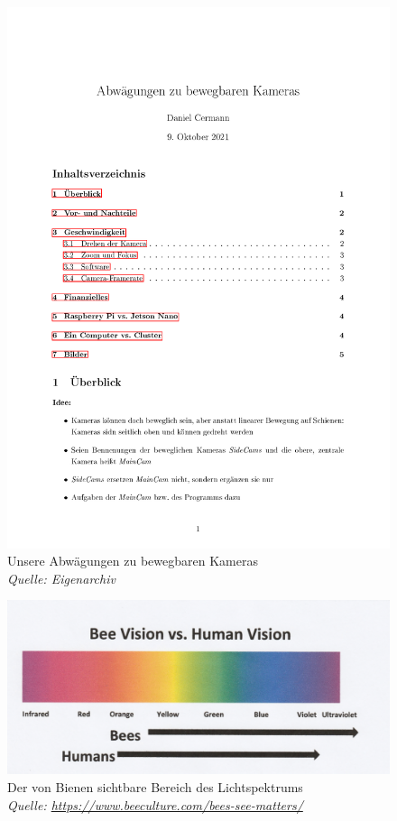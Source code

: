 \documentclass[11pt,a4paper]{article}
\begin{document}
\begin{figure}[H]
    \includegraphics[page=4, scale=.3]{images/TPZ_Cameras_Idea.pdf}    
    \caption{Unsere Abwägungen zu bewegbaren Kameras \\
    \textit{Quelle: Eigenarchiv}}
\end{figure}

\begin{figure}[H] \label{fig:bee-vision}
    \centering
    \includegraphics[width=.9\textwidth]{images/bee_vision.png}
    \caption{Der von Bienen sichtbare Bereich des Lichtspektrums \\
    \textit{Quelle: \url{https://www.beeculture.com/bees-see-matters/}}}
\end{figure}
\end{document}
